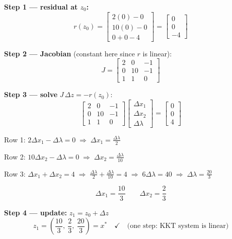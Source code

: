 \documentclass[10pt,a3paper]{article}
\begin{document}
\noindent
\begin{minipage}[t]{0.30\linewidth}

\textbf{Step 1 — residual at $z_0$:}
\[
  r(z_0) = \begin{bmatrix} 2(0)-0 \\ 10(0)-0 \\ 0+0-4 \end{bmatrix} = \begin{bmatrix} 0 \\ 0 \\ -4 \end{bmatrix}
\]

\textbf{Step 2 — Jacobian} (constant here since $r$ is linear):
\[
  J = \begin{bmatrix} 2 & 0 & -1 \\ 0 & 10 & -1 \\ 1 & 1 & 0 \end{bmatrix}
\]

\end{minipage}\hfill
\begin{minipage}[t]{0.64\linewidth}

\textbf{Step 3 — solve} $J\,\Delta z = -r(z_0)$:
\[
  \begin{bmatrix} 2 & 0 & -1 \\ 0 & 10 & -1 \\ 1 & 1 & 0 \end{bmatrix}
  \begin{bmatrix} \Delta x_1 \\ \Delta x_2 \\ \Delta\lambda \end{bmatrix}
  = \begin{bmatrix} 0 \\ 0 \\ 4 \end{bmatrix}
\]

Row 1: $2\Delta x_1 - \Delta\lambda = 0 \;\Rightarrow\; \Delta x_1 = \tfrac{\Delta\lambda}{2}$

Row 2: $10\Delta x_2 - \Delta\lambda = 0 \;\Rightarrow\; \Delta x_2 = \tfrac{\Delta\lambda}{10}$

Row 3: $\Delta x_1 + \Delta x_2 = 4 \;\Rightarrow\; \tfrac{\Delta\lambda}{2} + \tfrac{\Delta\lambda}{10} = 4 \;\Rightarrow\; 6\Delta\lambda = 40 \;\Rightarrow\; \Delta\lambda = \tfrac{20}{3}$

\[
  \Delta x_1 = \frac{10}{3} \qquad \Delta x_2 = \frac{2}{3}
\]

\textbf{Step 4 — update:} $z_1 = z_0 + \Delta z$
\[
  z_1 = \left(\frac{10}{3},\ \frac{2}{3},\ \frac{20}{3}\right) = x^* \quad \checkmark \quad \text{(one step: KKT system is linear)}
\]

\end{minipage}
\end{document}
